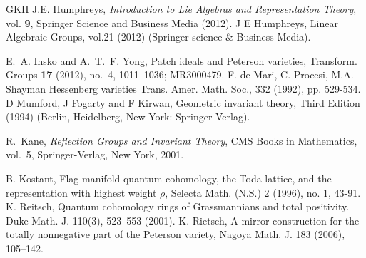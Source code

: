 \documentclass[12pt, reqno]{amsart}
\theoremstyle{plain}
\numberwithin{equation}{section}
\theoremstyle{definition}
\begin{document}
\begin{thebibliography}{GKH}
  J.E. Humphreys,
{\em Introduction to Lie Algebras and Representation Theory},
vol. {\bf 9}, Springer Science and Business Media (2012). 
	 J E Humphreys, {Linear Algebraic Groups}, vol.21 (2012) (Springer science \& Business Media).


  E.~A. Insko and A.~T.~F. Yong, Patch ideals and Peterson varieties, Transform. Groups {\bf 17} (2012), no.~4, 1011--1036; MR3000479.
   F. de Mari, C. Procesi, M.A. Shayman
Hessenberg varieties
Trans. Amer. Math. Soc., 332 (1992), pp. 529-534.
	 D Mumford, J Fogarty and F Kirwan, {Geometric invariant theory}, Third Edition (1994) (Berlin, Heidelberg, New York: Springer-Verlag).

R.~Kane,
\emph{Reflection Groups and Invariant Theory},
CMS Books in Mathematics, vol.~5,
Springer-Verlag, New York, 2001.

     B. Kostant, Flag manifold quantum cohomology, the Toda lattice, and the representation with highest weight $\rho$, Selecta Math. (N.S.) 2 (1996), no. 1, 43-91.
    K. Reitsch, Quantum cohomology rings of Grassmannians and total positivity. Duke Math. J. 110(3), 523–553 (2001).
 K. Rietsch, A mirror construction for the totally nonnegative part of the Peterson variety, Nagoya
Math. J. 183 (2006), 105–142.


\end{thebibliography}
\end{document}

